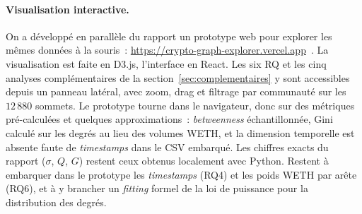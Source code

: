 \paragraph{Visualisation interactive.}
On a d\'evelopp\'e en parall\`ele du rapport un prototype web pour explorer
les m\^emes donn\'ees \`a la souris~: \url{https://crypto-graph-explorer.vercel.app}~\cite{cryptographexplorer_web}.
La visualisation est faite en D3.js, l'interface en React. Les six RQ et les
cinq analyses compl\'ementaires de la section~\ref{sec:complementaires} y
sont accessibles depuis un panneau lat\'eral, avec zoom, drag et filtrage
par communaut\'e sur les $12\,880$ sommets. Le prototype tourne dans le
navigateur, donc sur des m\'etriques pr\'e-calcul\'ees et quelques
approximations~: \textit{betweenness} \'echantillonn\'ee, Gini calcul\'e sur
les degr\'es au lieu des volumes WETH, et la dimension temporelle est
absente faute de \textit{timestamps} dans le CSV embarqu\'e. Les chiffres
exacts du rapport ($\sigma$, $Q$, $G$) restent ceux obtenus localement avec
Python. Restent \`a embarquer dans le prototype les \textit{timestamps}
(RQ4) et les poids WETH par ar\^ete (RQ6), et \`a y brancher un
\textit{fitting} formel de la loi de puissance pour la distribution des
degr\'es.
